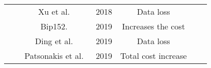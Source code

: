 \documentclass[acmsmall]{acmart}
\begin{document}
\begin{table*}
{\begin{tabular}{ccccccc}
                                                                                                                                              &                                                                                                                                        & Xu et al.~\cite{xu2018section}                                                                  &  2018                                                                                 &  Data loss                                                                                                                                         \\ 
                                                                                                                                              &                                                                                                                                        &  Bip152.~\cite{corallo2016bip152}                                                              &  2019                                                                               &  Increases the cost                                                                                                                                           \\ 
                                                                                                                                              &                                                                                                                                        &  Ding et al.~\cite{ding2019txilm}                                                                &  2019                                                                               &  Data loss                                                                                                                                          \\ 
                                                                                                                                              &                                                                                                                                         &  Patsonakis et al.~\cite{patsonakis2019alternative}                                    &  2019                                                                                &  Total cost increase                                                                                                                                                  \\ 

\end{tabular}}
\end{table*}
\end{document}
